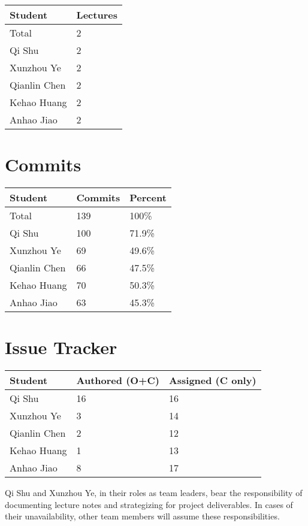 \documentclass{article}
\begin{document}
\begin{table}[H]
\centering
\begin{tabular}{ll}
\toprule
\textbf{Student} & \textbf{Lectures}\\
\midrule
Total        & 2          \\
Qi Shu       & 2          \\
Xunzhou Ye   & 2          \\
Qianlin Chen & 2          \\
Kehao Huang  & 2          \\
Anhao Jiao   & 2          \\
\bottomrule
\end{tabular}
\end{table}

\section{Commits}

\begin{table}[H]
\centering
\begin{tabular}{lll}
\toprule
\textbf{Student} & \textbf{Commits} & \textbf{Percent}\\
\midrule
Total & 139 & 100\% \\
Qi Shu       & 100     & 71.9\%    \\
Xunzhou Ye   & 69      & 49.6\%    \\
Qianlin Chen & 66      & 47.5\%    \\
Kehao Huang  & 70      & 50.3\%    \\
Anhao Jiao   & 63      & 45.3\%    \\
\bottomrule
\end{tabular}
\end{table}

\section{Issue Tracker}

\begin{table}[H]
\centering
\begin{tabular}{lll}
\toprule
\textbf{Student} & \textbf{Authored (O+C)} & \textbf{Assigned (C only)}\\
\midrule
Qi Shu       &  16 &   16\\
Xunzhou Ye   &   3 &   14\\
Qianlin Chen &   2 &   12\\
Kehao Huang  &   1 &   13\\
Anhao Jiao   &   8 &   17\\
\bottomrule
\end{tabular}
\end{table}

Qi Shu and Xunzhou Ye, in their roles as team leaders, bear the responsibility of documenting lecture notes and strategizing for project deliverables. In cases of their unavailability, other team members will assume these responsibilities.
\end{document}

